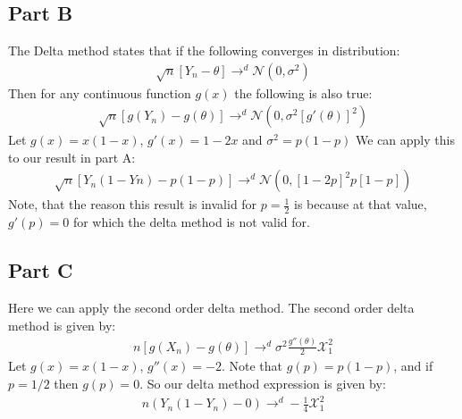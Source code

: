 \documentclass{article}
\begin{document}
\subsection*{Part B}
The Delta method states that if the following converges in distribution:
\begin{align*}
\sqrt{n}[Y_n - \theta] \rightarrow^d \mathcal{N}(0,\sigma^2)
\end{align*}
Then for any continuous function $g(x)$ the following is also true:
\begin{align*}
\sqrt{n}[g(Y_n) - g(\theta)] \rightarrow^d \mathcal{N}(0,\sigma^2 [g'(\theta)]^2)
\end{align*}
Let $g(x)=x(1-x)$, $g'(x)=1-2x$ and $\sigma^2=p(1 - p)$ We can apply this to our result in part A:
\begin{align*}
\boxed{ \sqrt{n}[Y_n(1 - Yn) - p(1 - p)] \rightarrow^d \mathcal{N}(0,[1 - 2p]^2 p[1 - p]) }
\end{align*}
Note, that the reason this result is invalid for $p=\frac{1}{2}$ is because at that value, $g'(p)=0$ for which the delta method is not valid for.
\subsection*{Part C}
Here we can apply the second order delta method. The second order delta method is given by:
\begin{align*}
n[g(X_n) - g(\theta)] \rightarrow^d \sigma^2 \frac{g''(\theta)}{2} \mathcal{X}^2_{1}
\end{align*}
Let $g(x)=x(1-x)$, $g''(x)=-2$. Note that $g(p) = p(1-p)$, and if $p=1/2$ then  $g(p) = 0$. So our delta method expression is given by:
\begin{align*}
\boxed{ n(Y_n(1-Y_n) - 0) \rightarrow^d -\frac{1}{4} \mathcal{X}^2_{1} }
\end{align*}
\end{document}
